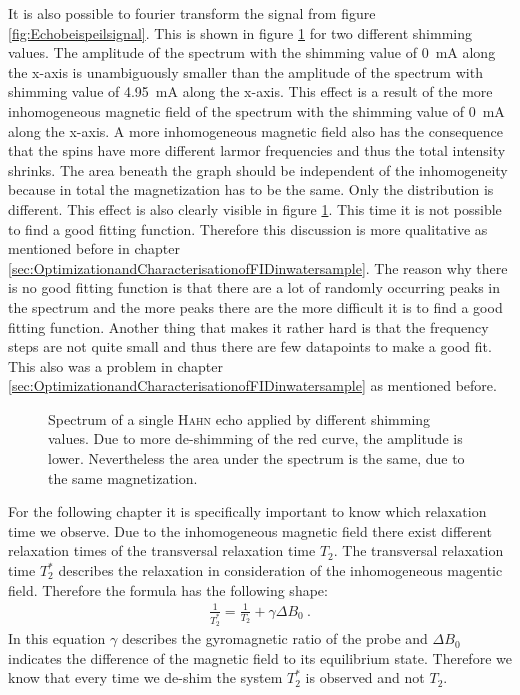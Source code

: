 It is also possible to fourier transform the signal from figure \ref{fig:Echobeispeilsignal}.
This is shown in figure \ref{fig:SpinEcho} for two different shimming values.
The amplitude of the spectrum with the shimming value of \SI{0}{\milli \ampere} along the x-axis is unambiguously smaller than the amplitude of the spectrum with shimming value of \SI{4.95}{\milli \ampere} along the x-axis.
This effect is a result of the more inhomogeneous magnetic field of the spectrum with the shimming value of \SI{0}{\milli \ampere} along the x-axis.
A more inhomogeneous magnetic field also has the consequence that the spins have more different larmor frequencies and thus the total intensity shrinks.
The area beneath the graph should be independent of the inhomogeneity because in total the magnetization has to be the same.
Only the distribution is different.
This effect is also clearly visible in figure \ref{fig:SpinEcho}.
This time it is not possible to find a good fitting function.
Therefore this discussion is more qualitative as mentioned before in chapter \ref{sec:OptimizationandCharacterisationofFIDinwatersample}.
The reason why there is no good fitting function is that there are a lot of randomly occurring peaks in the spectrum and the more peaks there are the more difficult it is to find a good fitting function.
Another thing that makes it rather hard is that the frequency steps are not quite small and thus there are few datapoints to make a good fit.
This also was a problem in chapter \ref{sec:OptimizationandCharacterisationofFIDinwatersample} as mentioned before.
\begin{figure}[H]
    \centering
    
    \caption[Spectrum of a single \textsc{Hahn} echo applied by different shimming values.]{Spectrum of a single \textsc{Hahn} echo applied by different shimming values.
    Due to more de-shimming of the red curve, the amplitude is lower.
    Nevertheless the area under the spectrum is the same, due to the same magnetization.}
    \label{fig:SpinEcho}
\end{figure}
For the following chapter it is specifically important to know which relaxation time we observe.
Due to the inhomogeneous magnetic field there exist different relaxation times of the transversal relaxation time $T_2$.
The transversal relaxation time $T_2^*$ describes the relaxation in consideration of the inhomogeneous magentic field.
Therefore the formula has the following shape:
\begin{align}
    \frac{1}{T_2^*} = \frac{1}{T_2} + \gamma \Delta B_0 \ .
    \label{eq:T2_star}
\end{align}
In this equation $\gamma$ describes the gyromagnetic ratio of the probe and $\Delta B_0$ indicates the difference of the magnetic field to its equilibrium state.
Therefore we know that every time we de-shim the system $T_2^*$ is observed and not $T_2$.